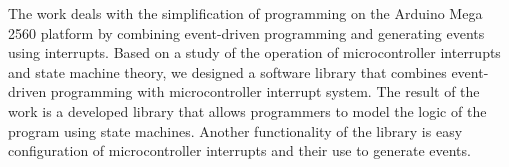 
The work deals with the simplification of programming on the Arduino Mega 2560 platform by combining event-driven programming and generating events using interrupts.
Based on a study of the operation of microcontroller interrupts and state machine theory, we designed a software library that combines event-driven programming
with microcontroller interrupt system.
The result of the work is a developed library that allows programmers to model the logic of the program using state machines. Another functionality of the library is
easy configuration of microcontroller interrupts and their use to generate events.